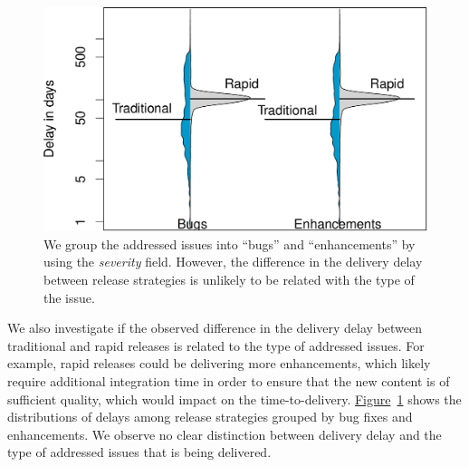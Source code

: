\begin{figure}[!]
	\centering
	\includegraphics[width=\columnwidth,keepaspectratio]
	{chapters/chapter5/figures/discussion/bugs_vs_enhancements.pdf}
	\caption{We group the addressed issues into ``bugs'' and
	``enhancements'' by using the \textit{severity} field.  However, the
difference in the delivery delay between release strategies is unlikely to be
related with the type of the issue.}
	\label{fig:bugs_vs_enhancements}
\end{figure}

\noindent{}
We also investigate if the observed difference in the delivery delay between
traditional and rapid releases is related to the type of addressed issues. For
example, rapid releases could be delivering more enhancements, which likely
require additional integration time in order to ensure that the new content is
of sufficient quality, which would impact on the time-to-delivery.
\hyperref[fig:bugs_vs_enhancements]{Figure}~\ref{fig:bugs_vs_enhancements} shows
the distributions of delays among release strategies grouped by bug fixes and
enhancements. We observe no clear distinction between delivery delay and the
type of addressed issues that is being delivered.

